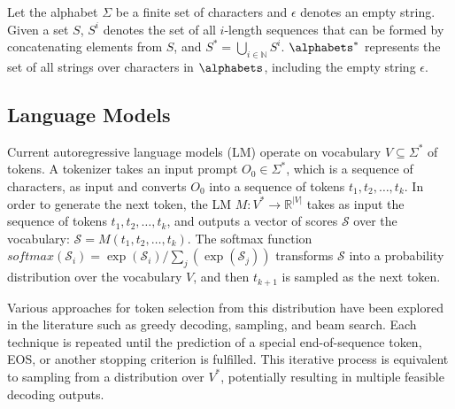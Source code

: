 

Let the alphabet $\Sigma$ be a finite set of characters and $\epsilon$ denotes an empty string.
Given a set $S$, $S^i$ denotes the set of all $i$-length sequences that can be formed by concatenating elements from $S$,
and $S^* = \bigcup_{i \in \mathbb{N}} S^i$.
$\alphabets^{*}$ represents the set of all strings over characters in $\alphabets$, including the empty string $\epsilon$. 

% 


\subsection{Language Models}

Current autoregressive language models (LM) operate on vocabulary $V \subseteq \Sigma^*$ of tokens.
A tokenizer takes an input prompt $O_0 \in \Sigma^*$,
which is a sequence of characters,
as input and converts $O_0$ into a sequence of tokens $t_1, t_2, \dots, t_k$. 
In order to generate the next token, the LM $M: V^* \to \mathbb{R}^{|V|}$ takes as input the sequence of tokens $t_1, t_2, \dots, t_k$, and outputs a vector of scores $\mathcal{S}$ over the vocabulary: $\mathcal{S} = M(t_1, t_2, \dots, t_k)$.
The softmax function $\textit{softmax}(\mathcal{S}_i) = \exp(\mathcal{S}_i)/\sum_j(\exp(\mathcal{S}_j))$ 
transforms $\mathcal{S}$ into a probability distribution over the vocabulary $V$, and then $t_{k+1}$ is sampled as the next token.

\sloppypar
{} 
Various approaches for token selection from this distribution have been explored in the literature such as greedy decoding, sampling, and beam search.
Each technique is repeated until the prediction of a special end-of-sequence token, EOS, or another stopping criterion is fulfilled. 
This iterative process is equivalent to sampling from a distribution over $V^*$, potentially resulting in multiple feasible decoding outputs.

